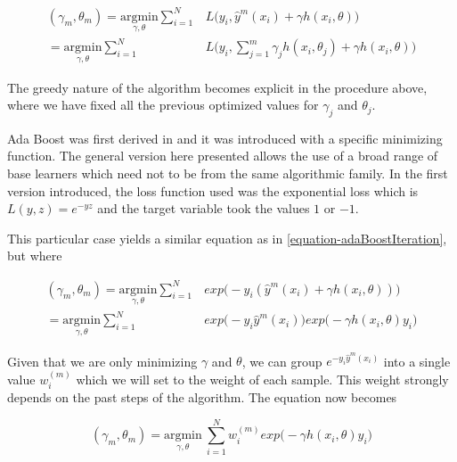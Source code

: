 \begin{equation} \label{equation-adaBoostIteration}
\begin{split}
(\gamma_{m}, \theta_{m}) = \underset{\gamma, \theta}{\mathrm{argmin}} \sum_{i=1}^{N} & L\big( y_i,  \hat{y}^{m}(x_i) + \gamma h(x_i,\theta) \big) \\
= \underset{\gamma, \theta}{\mathrm{argmin}} \sum_{i=1}^{N} & L\big( y_i,  \sum_{j=1}^{m} \gamma_j h(x_i,\theta_j) + \gamma h(x_i,\theta) \big)
\end{split}
\end{equation}

The greedy nature of the algorithm becomes explicit in the procedure above, where we have fixed all the previous optimized values for $\gamma_j$ and $\theta_j$.

Ada Boost was first derived in \textcite{schapire-adaBoost} and it was introduced with a specific minimizing function. The general version here presented allows the use of a broad range of base learners which need not to be from the same algorithmic family. In the first version introduced, the loss function used was the exponential loss which is $L(y,z) = e^{-yz}$ and the target variable took the values $1$ or $-1$.

This particular case yields a similar equation as in \cref{equation-adaBoostIteration}, but where

\begin{equation} \label{equation-adaBoostExponentialIteration}
\begin{split}
(\gamma_{m}, \theta_{m}) = \underset{\gamma, \theta}{\mathrm{argmin}} \sum_{i=1}^{N} & exp\big( -y_i (\hat{y}^{m}(x_i) + \gamma h(x_i,\theta) )\big) \\
= \underset{\gamma, \theta}{\mathrm{argmin}} \sum_{i=1}^{N} & exp\big( -y_i \hat{y}^{m}(x_i)\big) exp\big(- \gamma h(x_i,\theta)y_i \big)
\end{split}
\end{equation}


Given that we are only minimizing $\gamma$ and $\theta$, we can group $e^{-y_i \hat{y}^{m}(x_i)}$ into a single value $w_i^{(m)}$ which we will set to the weight of each sample. This weight strongly depends on the past steps of the algorithm. The equation now becomes


\begin{equation} \label{equation-adaBoostExponentialIteration2}
(\gamma_{m}, \theta_{m}) = \underset{\gamma, \theta}{\mathrm{argmin}} \  \sum_{i=1}^{N} w_i^{(m)} exp \big(-\gamma h(x_i,\theta)y_i \big)
\end{equation}

